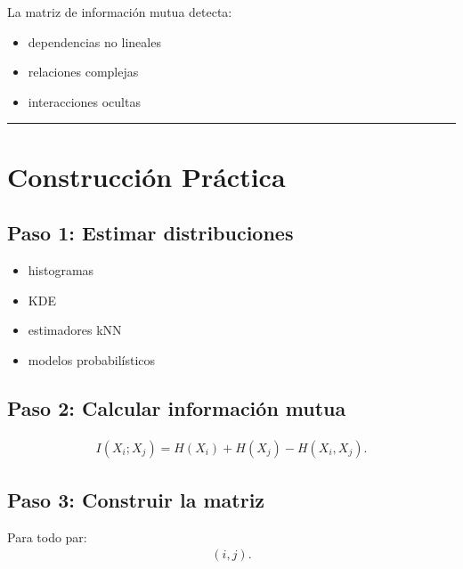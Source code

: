\documentclass[letterpaper,10pt,english]{jupyterBook}
\begin{document}
\sphinxAtStartPar
La matriz de información mutua detecta:
\begin{itemize}
\item {} 
\sphinxAtStartPar
dependencias no lineales

\item {} 
\sphinxAtStartPar
relaciones complejas

\item {} 
\sphinxAtStartPar
interacciones ocultas

\end{itemize}


\bigskip\hrule\bigskip



\section{Construcción Práctica}
\label{\detokenize{03_multivariate_models/mi_matrix:construccion-practica}}

\subsection{Paso 1: Estimar distribuciones}
\label{\detokenize{03_multivariate_models/mi_matrix:paso-1-estimar-distribuciones}}\begin{itemize}
\item {} 
\sphinxAtStartPar
histogramas

\item {} 
\sphinxAtStartPar
KDE

\item {} 
\sphinxAtStartPar
estimadores k\sphinxhyphen{}NN

\item {} 
\sphinxAtStartPar
modelos probabilísticos

\end{itemize}


\subsection{Paso 2: Calcular información mutua}
\label{\detokenize{03_multivariate_models/mi_matrix:paso-2-calcular-informacion-mutua}}\begin{equation*}
\begin{split}
I(X_i;X_j)
=
H(X_i)+H(X_j)-H(X_i,X_j).
\end{split}
\end{equation*}

\subsection{Paso 3: Construir la matriz}
\label{\detokenize{03_multivariate_models/mi_matrix:paso-3-construir-la-matriz}}
\sphinxAtStartPar
Para todo par:
\begin{equation*}
\begin{split}
(i,j).
\end{split}
\end{equation*}
\end{document}
